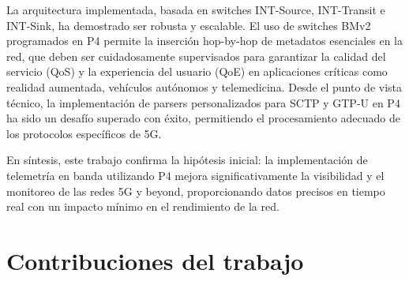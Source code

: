 La arquitectura implementada, basada en switches INT-Source, INT-Transit e INT-Sink, ha demostrado ser robusta y escalable. 
El uso de switches BMv2 programados en P4 permite la inserción hop-by-hop de metadatos esenciales en la red, que deben ser cuidadosamente supervisados para garantizar la calidad del servicio (QoS) y la experiencia del usuario (QoE) en aplicaciones críticas como realidad aumentada, vehículos autónomos y telemedicina.
Desde el punto de vista técnico, la implementación de parsers personalizados para SCTP y GTP-U en P4 ha sido un desafío superado con éxito, permitiendo el procesamiento adecuado de los protocolos específicos de 5G.

En síntesis, este trabajo confirma la hipótesis inicial: la implementación de telemetría en banda utilizando P4 mejora significativamente la visibilidad y el monitoreo de las redes 5G y beyond, proporcionando datos precisos en tiempo real con un impacto mínimo en el rendimiento de la red. 
\section{Contribuciones del trabajo}

